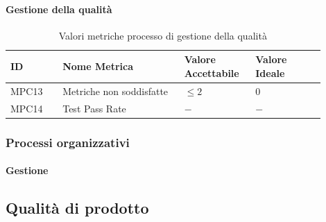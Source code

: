 \documentclass[a4paper,12pt]{article}
\begin{document}
                \paragraph{Gestione della qualità} \mbox{}
                    \begin{longtable}{|M{0.15\linewidth}|M{0.35\linewidth}|M{0.2\linewidth}|M{0.2\linewidth}|}

                        \caption{Valori metriche processo di gestione della qualità} \\
                        \hline
                        \textbf{ID} & \textbf{Nome Metrica} & \textbf{Valore Accettabile} & \textbf{Valore Ideale} \\
                        \hline
                        \endhead

                        MPC13 & Metriche non soddisfatte & $\le 2$ & $0$ \\
                        \hline

                        MPC14 & Test Pass Rate & $-$ & $-$ \\
                        \hline

                    \end{longtable}


            \subsubsection{Processi organizzativi}
                \paragraph{Gestione} \mbox{}



        \subsection{Qualità di prodotto}
\end{document}
